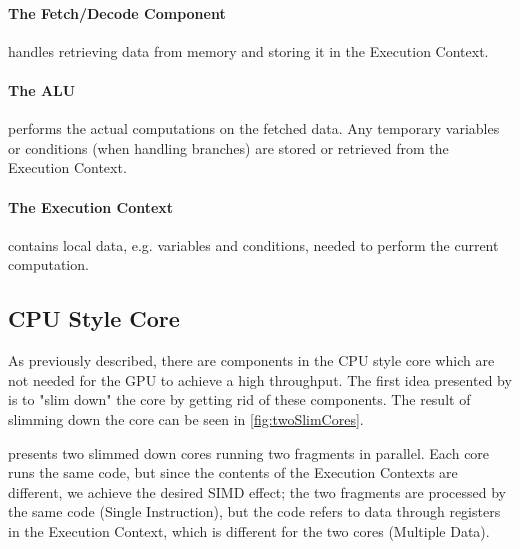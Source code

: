 \paragraph{The Fetch/Decode Component} handles retrieving data from memory and storing it in the Execution Context. 

\paragraph{The \gls{ALU}} performs the actual computations on the fetched data. Any temporary variables or conditions (when handling branches) are stored or retrieved from the Execution Context.

\paragraph{The Execution Context} contains local data, e.g. variables and conditions, needed to perform the current computation. 

\subsection{\acs{CPU} Style Core}
As previously described, there are components in the \gls{CPU} style core which are not needed for the \gls{GPU} to achieve a high throughput.
The first idea presented by \citet{intro_to_gpu_arch} is to "slim down" the core by getting rid of these components.
The result of slimming down the core can be seen in \cref{fig:twoSlimCores}.



 presents two slimmed down cores running two fragments in parallel. 
Each core runs the same code, but since the contents of the Execution Contexts are different, we achieve the desired \gls{SIMD} effect; the two fragments are processed by the same code (Single Instruction), but the code refers to data through registers in the Execution Context, which is different for the two cores (Multiple Data).

